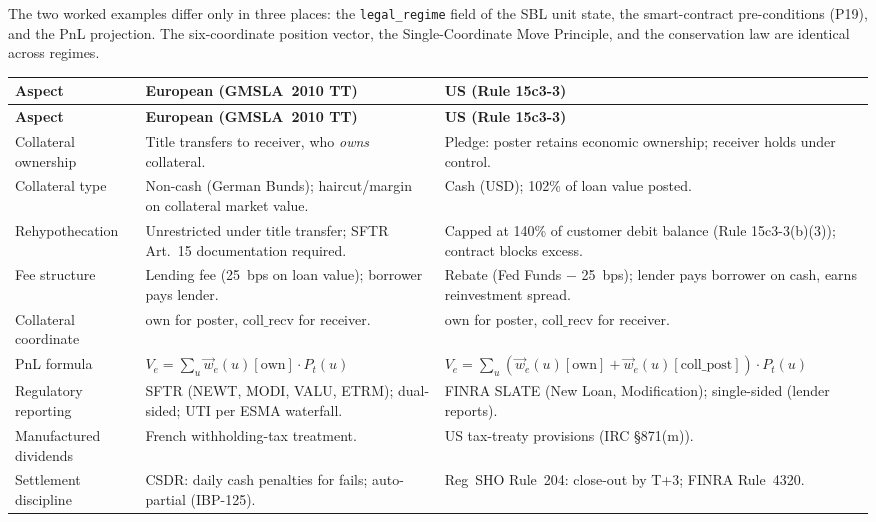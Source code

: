 \documentclass[11pt,a4paper]{article}
\begin{document}
The two worked examples differ only in three places: the \texttt{legal\_regime} field of the SBL unit state, the smart-contract pre-conditions (P19), and the PnL projection. The six-coordinate position vector, the Single-Coordinate Move Principle, and the conservation law are identical across regimes.

\begin{center}\small
\begin{longtable}{p{3.2cm} p{5.2cm} p{5.2cm}}
\toprule
\textbf{Aspect} & \textbf{European (GMSLA~2010 TT)} & \textbf{US (Rule 15c3-3)} \\
\midrule
\endfirsthead
\toprule
\textbf{Aspect} & \textbf{European (GMSLA~2010 TT)} & \textbf{US (Rule 15c3-3)} \\
\midrule
\endhead
\bottomrule
\endfoot
Collateral ownership & Title transfers to receiver, who \emph{owns} collateral. & Pledge: poster retains economic ownership; receiver holds under control. \\
\midrule
Collateral type & Non-cash (German Bunds); haircut/margin on collateral market value. & Cash (USD); 102\% of loan value posted. \\
\midrule
Rehypothecation & Unrestricted under title transfer; SFTR Art.~15 documentation required. & Capped at 140\% of customer debit balance (Rule 15c3-3(b)(3)); contract blocks excess. \\
\midrule
Fee structure & Lending fee (25~bps on loan value); borrower pays lender. & Rebate (Fed Funds $-$ 25~bps); lender pays borrower on cash, earns reinvestment spread. \\
\midrule
Collateral coordinate & $\mathrm{own}$ for poster, $\mathrm{coll\_recv}$ for receiver. & $\mathrm{own}$ for poster, $\mathrm{coll\_recv}$ for receiver. \\
\midrule
PnL formula & $V_e = \sum_u \vec{w}_e(u)[\mathrm{own}] \cdot P_t(u)$ & $V_e = \sum_u (\vec{w}_e(u)[\mathrm{own}] + \vec{w}_e(u)[\mathrm{coll\_post}]) \cdot P_t(u)$ \\
\midrule
Regulatory reporting & SFTR (NEWT, MODI, VALU, ETRM); dual-sided; UTI per ESMA waterfall. & FINRA SLATE (New Loan, Modification); single-sided (lender reports). \\
\midrule
Manufactured dividends & French withholding-tax treatment. & US tax-treaty provisions (IRC \S871(m)). \\
\midrule
Settlement discipline & CSDR: daily cash penalties for fails; auto-partial (IBP-125). & Reg~SHO Rule~204: close-out by T+3; FINRA Rule~4320. \\

\end{longtable}
\end{center}
\end{document}
